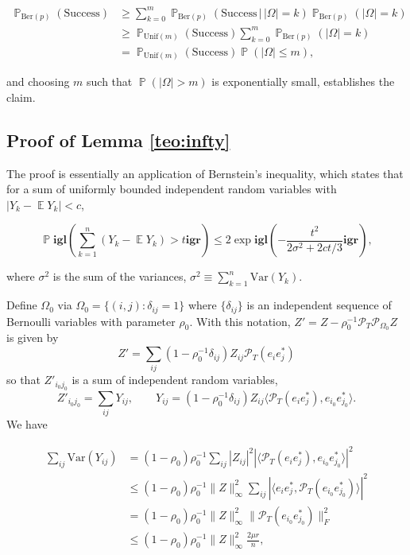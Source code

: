 \begin{align*}
  \operatorname{\mathbb{P}}_{\text{Ber}(p)}(\text{Success}) & \ge \sum_{k = 0}^{m} \operatorname{\mathbb{P}}_{\text{Ber}(p)}(\text{Success} \, | \, |\Omega| = k) \operatorname{\mathbb{P}}_{\text{Ber}(p)}(|\Omega| = k)\\
  & \ge \operatorname{\mathbb{P}}_{\text{Unif}(m)}(\text{Success}) \sum_{k = 0}^{m} \operatorname{\mathbb{P}}_{\text{Ber}(p)}(|\Omega| = k)\\
  & = \operatorname{\mathbb{P}}_{\text{Unif}(m)}(\text{Success}) \operatorname{\mathbb{P}}(|\Omega| \le m),
\end{align*}

and choosing $m$ such that $\operatorname{\mathbb{P}}(|\Omega| > m)$ is exponentially small, establishes the claim.

\subsection{Proof of Lemma \ref{teo:infty}}

The proof is essentially an application of Bernstein's inequality, which states that for a sum of uniformly bounded independent random variables with $|Y_k - \operatorname{\mathbb{E}} Y_k| < c$,

\begin{equation}
 \label{eq:bern2}
 \operatorname{\mathbb{P}}\mathbf{igl}(\sum_{k = 1}^n (Y_k - \operatorname{\mathbb{E}} Y_k) > t\mathbf{igr}) \le 2 \exp\mathbf{igl}(-\frac{t^2}{2\sigma^2 + 2ct/3}\mathbf{igr}),
\end{equation}

where $\sigma^2$ is the sum of the variances, $\sigma^2 \equiv \sum_{k
 = 1}^n \text{Var}(Y_k)$. 

Define $\Omega_0$ via $\Omega_0 = \{(i,j) : \delta_{ij} = 1\}$ where
$\{\delta_{ij}\}$ is an independent sequence of Bernoulli variables with parameter $\rho_0$.  With this notation, $Z' = Z - \rho_0^{-1} \mathcal{P}_T
\mathcal{P}_{\Omega_0} Z$ is given by 
\[
Z' = \sum_{ij} (1 - \rho_0^{-1} \delta_{ij}) Z_{ij} \mathcal{P}_T(e_ie_j^*)
\]
so that $Z'_{i_0j_0}$ is a sum of independent random variables, 
\[
Z'_{i_0j_0} = \sum_{ij} Y_{ij}, \qquad Y_{ij} = (1 - \rho_0^{-1}
\delta_{ij}) Z_{ij} \langle \mathcal{P}_T(e_ie_j^*), e_{i_0} e_{j_0}^*\rangle.
\]
We have

\begin{align*}
\sum_{ij} \text{Var}(Y_{ij}) & = (1-\rho_0) \rho_0^{-1}  \sum_{ij}
|Z_{ij}|^2 |\langle \mathcal{P}_T(e_ie_j^*), e_{i_0} e_{j_0}^*\rangle|^2\\
& \le   (1-\rho_0) \rho_0^{-1}  \|Z\|_\infty^2 \sum_{ij} |\langle e_ie_j^*, \mathcal{P}_T(e_{i_0} e_{j_0}^*)\rangle|^2\\
& =  (1-\rho_0) \rho_0^{-1}  \|Z\|_\infty^2 \|\mathcal{P}_T(e_{i_0} e_{j_0}^*)\|_F^2\\
 & \le  (1-\rho_0) \rho_0^{-1}  \|Z\|_\infty^2 \frac{2\mu r}{n},
\end{align*}

